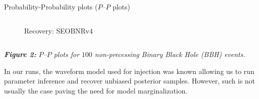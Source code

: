 \documentclass[serif]{beamer}
\begin{document}
\begin{frame}{}
\begin{columns}
\begin{column}[T]{0.35\textwidth}
\begin{block}{Probability-Probability plots ($P$--$P$ plots)}
\begin{center}
\begin{center}
\begin{columns}
\begin{column}{0.45\textwidth}
\begin{figure}
{{        Recovery: SEOBNRv$4$}}
        \end{figure}
      \end{column}
       
    \end{columns}
    \vspace{0.4em}
 \emph{ \small{\textbf{Figure 2:} $P$--$P$ plots for $100$ non-precessing Binary Black Hole (BBH) events.}}
   \end{center}



  \end{center}

  



\vspace{0.5em}

\normalsize{In our runs, the waveform model used for injection was known allowing us to run parameter inference and recover unbiased posterior samples. However, such is not usually the case paving the need for model marginalization.}
 


\end{block}
\end{column}
\end{columns}
\end{frame}
\end{document}
